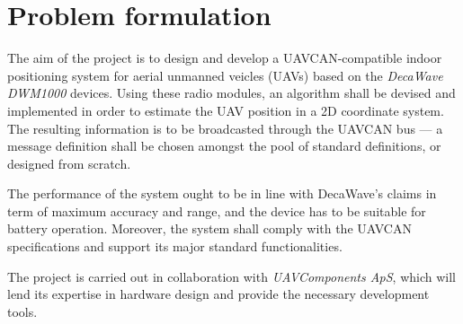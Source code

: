\section{Problem formulation}\label{sec:problem}

The aim of the project is to design and develop a UAVCAN-compatible indoor positioning system for aerial unmanned veicles (UAVs) based on the \emph{DecaWave DWM1000} devices.
Using these radio modules, an algorithm shall be devised and implemented in order to estimate the UAV position in a 2D coordinate system.
The resulting information is to be broadcasted through the UAVCAN bus --- a message definition shall be chosen amongst the pool of standard definitions, or designed from scratch.

The performance of the system ought to be in line with DecaWave's claims in term of maximum accuracy and range, and the device has to be suitable for battery operation.
Moreover, the system shall comply with the UAVCAN specifications and support its major standard functionalities.

The project is carried out in collaboration with \emph{UAVComponents ApS}, which will lend its expertise in hardware design and provide the necessary development tools.
